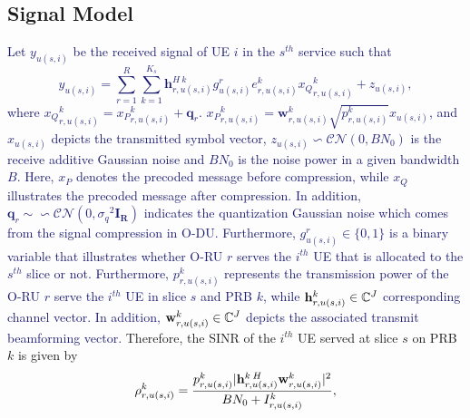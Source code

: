\documentclass[lettersize,journal]{IEEEtran}
\begin{document}
\subsection{Signal Model}
\textcolor{MidnightBlue}{Let $y_{u(s,i)} $ be the received signal of UE $i$ in the $s^{th}$ service such that
\begin{equation}\label{eq2}
y_{u(s,i)} = \sum_{r = 1}^{R}\sum_{k=1}^{K_s} \boldsymbol{h}^{H \: k}_{r,u(s,i)} g_{u(s,i)}^r e^k_{r,u(s,i)}{x_Q}^k_{r,u(s,i)}+ z_{u(s,i)},
\end{equation}
where ${x_Q}^k_{r,u(s,i)} ={x_P}^k_{r,u(s,i)}+ \boldsymbol{q}_{r}$. ${x_P}^k_{r,u(s,i)}= \boldsymbol{w}^k_{r,u(s,i)}\sqrt{p^{k}_{r,u(s,i)}} x_{u(s,i)} $, and  $ x_{u(s,i)}$ depicts the transmitted symbol vector, $z_{u(s,i)}\backsim \mathcal{CN}(0,BN_0)$ is the receive additive Gaussian noise and $BN_0$ is the noise power in a given bandwidth $B$.
Here, ${x_P}$ denotes the precoded message before compression, while ${x_Q}$ illustrates the precoded message after compression.%
In addition, $\boldsymbol{q}_{r} \sim \backsim \mathcal{CN}(0,{\sigma_q}^2\boldsymbol{I_{R}} )$ indicates the quantization Gaussian noise which comes from the signal compression in O-DU.
Furthermore, $g_{u(s,i)}^r \in \{0,1\}$ is a binary variable that illustrates whether O-RU $r$ serves the $i^{th}$ UE that is allocated to the $s^{th}$ slice or not.
Furthermore, $p_{r,u(s,i)}^{k}$ represents the transmission power of the O-RU $r$ serve the $i^{th}$ UE in slice $s$ and PRB $k$, while
${\bold{h}_{r,u(s,i)}^{k}} \in \mathbb{C}^{J}$ corresponding channel vector.
In addition, $\bold{w}_{r,u(s,i)}^{k} \in \mathbb{C}^{J}$ depicts the associated transmit beamforming vector.}
Therefore, the SINR of the $i^{th}$ UE served at slice $s$ on PRB $k$ is given by
\begin{equation}\label{eq1}
\rho_{r,u(s,i)}^{k} =  \frac{p_{r,u(s,i)}^{k}|{\bold{h}_{r,u(s,i)}^{k \: H}} \bold{w}_{r,u(s,i)}^{k}|^2}{BN_0 + I_{r,u(s,i)}^{k}},
\end{equation}
\end{document}
